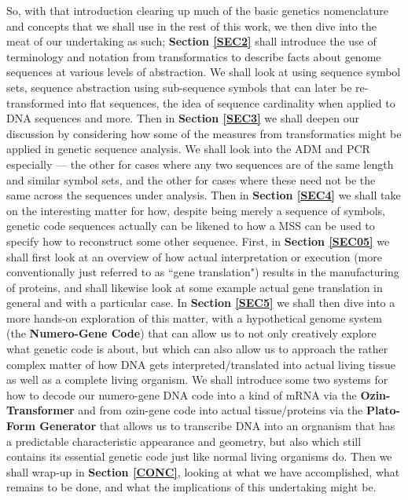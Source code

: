 \documentclass[a4paper, 18pt]{article} %
\begin{document}
So, with that introduction clearing up much of the basic genetics nomenclature and concepts that we shall use in the rest of this work, we then dive into the meat of our undertaking as such; \textbf{Section \ref{SEC2}} shall introduce the use of terminology and notation from transformatics to describe facts about genome sequences at various levels of abstraction. We shall look at using sequence symbol sets, sequence abstraction using sub-sequence symbols that can later be re-transformed into flat sequences, the idea of sequence cardinality when applied to DNA sequences and more. Then in \textbf{Section \ref{SEC3}} we shall deepen our discussion by considering how some of the measures from transformatics might be applied in genetic sequence analysis. We shall look into the ADM and PCR especially --- the other for cases where any two sequences are of the same length and similar symbol sets, and the other for cases where these need not be the same across the sequences under analysis. Then in \textbf{Section \ref{SEC4}} we shall take on the interesting matter for how, despite being merely a sequence of symbols, genetic code sequences actually can be likened to how a MSS can be used to specify how to reconstruct some other sequence. First, in \textbf{Section \ref{SEC05}} we shall first look at an overview of how actual interpretation or execution (more conventionally just referred to as ``gene translation") results in the manufacturing of proteins, and shall likewise look at some example actual gene translation in general and with a particular case. In \textbf{Section \ref{SEC5}} we shall then dive into a more hands-on exploration of this matter, with a hypothetical genome system (the \textbf{Numero-Gene Code}) that can allow us to not only creatively explore what genetic code is about, but which can also allow us to approach the rather complex matter of how DNA gets interpreted/translated into actual living tissue as well as a complete living organism. We shall introduce some two systems for how to decode our numero-gene DNA code into a kind of mRNA via the \textbf{Ozin-Transformer} and from ozin-gene code into actual tissue/proteins via the \textbf{Plato-Form Generator} that allows us to transcribe DNA into an orgnanism that has a predictable characteristic appearance and geometry, but also which still contains its essential genetic code just like normal living organisms do. Then we shall wrap-up in \textbf{Section \ref{CONC}}, looking at what we have accomplished, what remains to be done, and what the implications of this undertaking might be.
\end{document}
